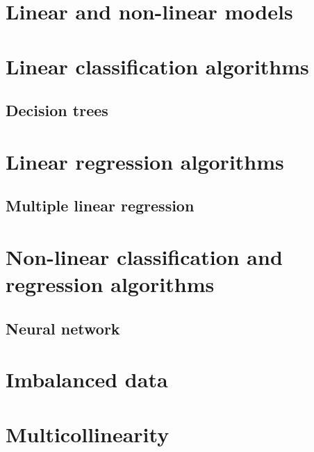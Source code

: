 	


	

\section{Linear and non-linear models}

\section{Linear classification algorithms}
	\subsection{Decision trees}

\section{Linear regression algorithms}
	\subsection{Multiple linear regression} \label{sec:mul-lin-reg}

\section{Non-linear classification and regression algorithms}
	\subsection{Neural network}

\section{Imbalanced data}

\section{Multicollinearity}
